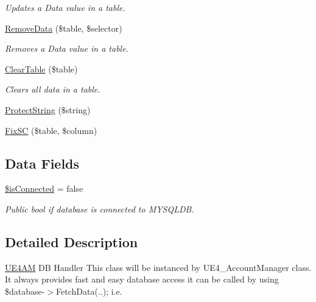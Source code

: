 \begin{DoxyCompactItemize}
\begin{DoxyCompactList}\small\item\em Updates a Data value in a table. \end{DoxyCompactList}\item 
\hyperlink{class_u_e4_a_m___d_b_handler_a506e0999a4c4050889d2899f4c50ce46}{Remove\-Data} (\$table, \$selector)
\begin{DoxyCompactList}\small\item\em Removes a Data value in a table. \end{DoxyCompactList}\item 
\hyperlink{class_u_e4_a_m___d_b_handler_aa34854f1f621fbbe81c8af133952c360}{Clear\-Table} (\$table)
\begin{DoxyCompactList}\small\item\em Clears all data in a table. \end{DoxyCompactList}\item 
\hyperlink{class_u_e4_a_m___d_b_handler_a0def1ab6b6f2467524ef53d578204d64}{Protect\-String} (\$string)
\item 
\hyperlink{class_u_e4_a_m___d_b_handler_a15e31611d6efcedddeeafd7d25a7e583}{Fix\-S\-C} (\$table, \$column)
\end{DoxyCompactItemize}
\subsection*{Data Fields}
\begin{DoxyCompactItemize}
\item 
\hyperlink{class_u_e4_a_m___d_b_handler_a50ceed0b08e9ad3dcaecc2ac188b2047}{\$is\-Connected} = false
\begin{DoxyCompactList}\small\item\em Public bool if database is connected to M\-Y\-S\-Q\-L\-D\-B. \end{DoxyCompactList}\end{DoxyCompactItemize}


\subsection{Detailed Description}
\hyperlink{class_u_e4_a_m}{U\-E4\-A\-M} D\-B Handler This class will be instanced by U\-E4\-\_\-\-Account\-Manager class. It always provides fast and easy database access it can be called by using \$database-\/$>$Fetch\-Data(..); i.\-e. 

